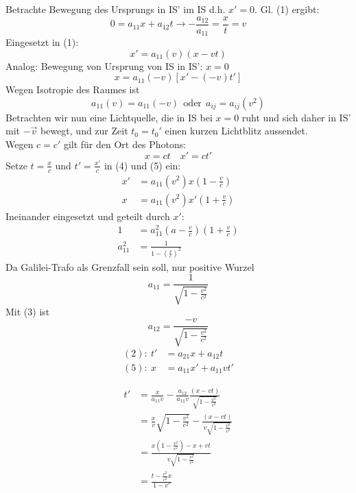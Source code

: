 \documentclass[titlepage,12pt,a4paper,ngerman]{report}
\newcommand{\tx}[1]{\textrm{#1}}
\begin{document}
Betrachte Bewegung des Ursprungs in IS' im IS d.h. $ x' = 0 $. Gl. (1) ergibt:
\begin{equation*}
0 = a_{11} x + a_{12} t \rightarrow - \frac{a_{12}}{a_{11}} = \frac{x}{t} = v \tag{3}
\end{equation*}
Eingesetzt in (1):
\begin{equation*}
x' = a_{11}(v) (x-vt) \tag{4}
\end{equation*}
Analog: Bewegung von Ursprung von IS in IS': $ x = 0 $
\begin{equation*}
x = a_{11}(-v) [x' - (-v) t'] \tag{5}
\end{equation*}
Wegen Isotropie des Raumes ist
\begin{equation*}
a_{11}(v) = a_{11}(-v) \ \ \tx{oder} \ \ a_{ij} = a_{ij}(v^2)
\end{equation*}
Betrachten wir nun eine Lichtquelle, die in IS bei $ x=0 $ ruht und sich daher in IS' mit $ -\vec{v} $ bewegt, und zur Zeit $ t_0 = t_0' $ einen kurzen Lichtblitz aussendet.\\
Wegen $ c = c' $ gilt für den Ort des Photons:
\begin{equation*}
x = ct \quad x' = ct' \tag{6}
\end{equation*}
Setze $ t = \frac{x}{c} $ und $ t' = \frac{x'}{c} $ in (4) und (5) ein:
\begin{align*}
x' &= a_{11}(v^2) x(1-\frac{v}{c}) \tag{7} \\
x &= a_{11}(v^2) x'(1+\frac{v}{c}) \tag{7}
\end{align*}
Ineinander eingesetzt und geteilt durch $ x' $:
\begin{align}
1 &= a_{11}^2 (a-\frac{v}{c}) (1+\frac{v}{c})\\
a_{11}^2 &= \frac{1}{1-(\frac{v}{c})^2}
\end{align}
Da Galilei-Trafo als Grenzfall sein soll, nur positive Wurzel
\begin{equation*}
a_{11} = \frac{1}{\sqrt{1 - \frac{v^2}{c^2}}} \tag{8}
\end{equation*}
Mit (3) ist $$a_{12} = \frac{-v}{\sqrt{1 - \frac{v^2}{c^2}}}$$
\begin{align*}
(2):\ t' &= a_{21} x + a_{12} t\\
(5):\ x &= a_{11} x' + a_{11} v t'
\end{align*}





\begin{align*}
t' &= \frac{x}{a_{11} v} - \frac{a_{12}}{a_{11} v} \frac{(x-vt)}{\sqrt{1-\frac{v^2}{c^2}}}\\
&= \frac{x}{v} \sqrt{1-\frac{v^2}{c^2}} - \frac{(x-vt)}{v \sqrt{1-\frac{v^2}{c^2}}}\\
&= \frac{x (1-\frac{v^2}{c^2}) - x + vt}{v \sqrt{1-\frac{v^2}{c^2}}}\\
&= \frac{t - \frac{v^2}{c^2} x}{1 - v'}
\end{align*}
\end{document}
